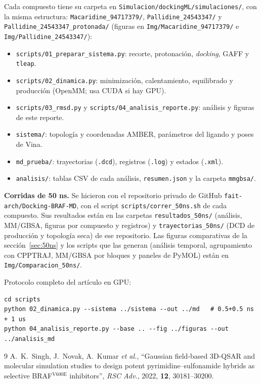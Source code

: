 \documentclass[11pt,a4paper]{article}
\begin{document}
Cada compuesto tiene su carpeta en \texttt{Simulacion/dockingML/simulaciones/}, con la misma estructura:
\texttt{Macaridine\_94717379/}, \texttt{Pallidine\_24543347/} y \texttt{Pallidine\_24543347\_protonada/}
(figuras en \texttt{Img/Macaridine\_94717379/}
e \texttt{Img/Pallidine\_24543347/}):
\begin{itemize}
\item \texttt{scripts/01\_preparar\_sistema.py}: recorte, protonación, \textit{docking}, GAFF y \texttt{tleap}.
\item \texttt{scripts/02\_dinamica.py}: minimización, calentamiento, equilibrado y producción (OpenMM; usa CUDA si hay GPU).
\item \texttt{scripts/03\_rmsd.py} y \texttt{scripts/04\_analisis\_reporte.py}: análisis y figuras de este reporte.
\item \texttt{sistema/}: topología y coordenadas AMBER, parámetros del ligando y poses de Vina.
\item \texttt{md\_prueba/}: trayectorias (\texttt{.dcd}), registros (\texttt{.log}) y estados (\texttt{.xml}).
\item \texttt{analisis/}: tablas CSV de cada análisis, \texttt{resumen.json} y la carpeta \texttt{mmgbsa/}.
\end{itemize}

\textbf{Corridas de 50 ns.} Se hicieron con el repositorio privado de GitHub \texttt{fait-arch/Docking-BRAF-MD},
con el script \texttt{scripts/correr\_50ns.sh} de cada compuesto. Sus resultados están en las carpetas
\texttt{resultados\_50ns/} (análisis, MM/GBSA, figuras por compuesto y registros) y \texttt{trayectorias\_50ns/}
(DCD de producción y topología seca) de ese repositorio. Las figuras comparativas de la
sección~\ref{sec:50ns} y los scripts que las generan (análisis temporal, agrupamiento con CPPTRAJ, MM/GBSA por
bloques y paneles de PyMOL) están en \texttt{Img/Comparacion\_50ns/}.

Protocolo completo del artículo en GPU:
\begin{verbatim}
cd scripts
python 02_dinamica.py --sistema ../sistema --out ../md   # 0.5+0.5 ns + 1 us
python 04_analisis_reporte.py --base .. --fig ../figuras --out ../analisis_md
\end{verbatim}

\begin{thebibliography}{9}
 A.~K.~Singh, J.~Novak, A.~Kumar \textit{et al.}, ``Gaussian field-based 3D-QSAR and
molecular simulation studies to design potent pyrimidine--sulfonamide hybrids as selective BRAF$^{\text{V600E}}$
inhibitors'', \textit{RSC Adv.}, 2022, \textbf{12}, 30181--30200.
\end{thebibliography}
\end{document}
